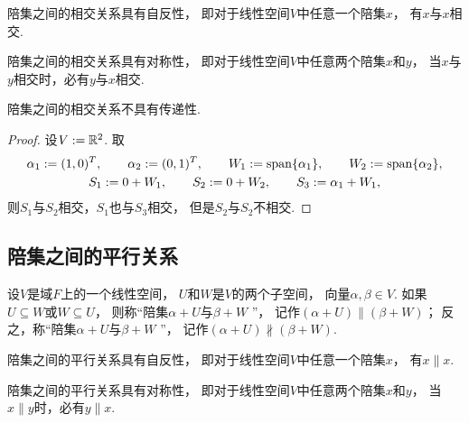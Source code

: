 \begin{property}
陪集之间的相交关系具有自反性，
即对于线性空间\(V\)中任意一个陪集\(x\)，
有\(x\)与\(x\)相交.
\end{property}

\begin{property}
陪集之间的相交关系具有对称性，
即对于线性空间\(V\)中任意两个陪集\(x\)和\(y\)，
当\(x\)与\(y\)相交时，必有\(y\)与\(x\)相交.
\end{property}

\begin{property}
陪集之间的相交关系不具有传递性.
\begin{proof}
设\(V := \mathbb{R}^2\).
取\begin{gather*}
	\alpha_1 := (1,0)^T,
	\qquad
	\alpha_2 := (0,1)^T,
	\qquad
	W_1 := \operatorname{span}\{\alpha_1\},
	\qquad
	W_2 := \operatorname{span}\{\alpha_2\}, \\
	S_1 := 0 + W_1,
	\qquad
	S_2 := 0 + W_2,
	\qquad
	S_3 := \alpha_1 + W_1,
\end{gather*}
则\(S_1\)与\(S_2\)相交，\(S_1\)也与\(S_3\)相交，
但是\(S_2\)与\(S_2\)不相交.
\end{proof}
\end{property}

\subsection{陪集之间的平行关系}
\begin{definition}
设\(V\)是域\(F\)上的一个线性空间，
\(U\)和\(W\)是\(V\)的两个子空间，
向量\(\alpha,\beta \in V\).
如果\(U \subseteq W\)或\(W \subseteq U\)，
则称“陪集\(\alpha + U\)与\(\beta + W\) ”，
记作\((\alpha + U) \parallel (\beta + W)\)；
反之，称“陪集\(\alpha + U\)与\(\beta + W\) ”，
记作\((\alpha + U) \nparallel (\beta + W)\).
\end{definition}

\begin{property}
陪集之间的平行关系具有自反性，
即对于线性空间\(V\)中任意一个陪集\(x\)，
有\(x \parallel x\).
\end{property}

\begin{property}
陪集之间的平行关系具有对称性，
即对于线性空间\(V\)中任意两个陪集\(x\)和\(y\)，
当\(x \parallel y\)时，必有\(y \parallel x\).
\end{property}


